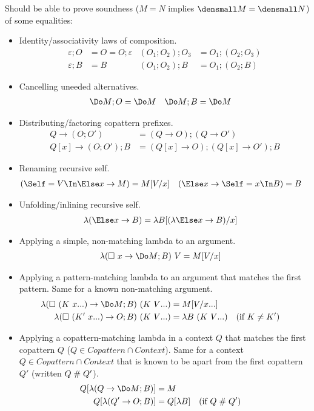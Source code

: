 \documentclass[runningheads]{llncs}
\begin{document}
Should be able to prove soundness ($M = N$ implies $\den{M} = \den{N}$) of some
equalities:
\begin{itemize}
\item Identity/associativity laws of composition.
  \begin{align*}
    \varepsilon; O &= O = O; \varepsilon
    &
    (O_1; O_2); O_3 &= O_1; (O_2; O_3)
    \\
    \varepsilon; B &= B
    &
    (O_1; O_2); B &= O_1; (O_2; B)
  \end{align*}
\item Cancelling uneeded alternatives.
  \begin{align*}
    \Do M; O &= \Do M
    &
    \Do M; B &= \Do M
  \end{align*}
\item Distributing/factoring copattern prefixes.
  \begin{align*}
    Q \to (O; O')
    &=
    (Q \to O); (Q \to O')
    \\
    Q[x] \to (O; O'); B
    &=
    (Q[x] \to O); (Q[x] \to O'); B
  \end{align*}
\item Renaming recursive self.
  \begin{align*}
    (\Self = V \In \Else x \to M) &= M\subst{x}{V}
    &
    (\Else x \to \Self = x \In B) &= B
  \end{align*}
\item Unfolding/inlining recursive self.
  \begin{align*}
    \lambda(\Else x \to B) &= \lambda B\subst{x}{(\lambda \Else x \to B)}
  \end{align*}
\item Applying a simple, non-matching lambda to an argument.
  \begin{align*}
    \lambda(\hole~x \to \Do M; B) ~ V
    &=
    M\subst{x}{V}
  \end{align*}
\item Applying a pattern-matching lambda to an argument that matches the
  first pattern.  Same for a known non-matching argument.
  \begin{align*}
    \lambda(\hole~(K~\many{x}) \to \Do M; B) ~ (K~\many{V})
    &=
    M\subs{\many{\asub{x}{V}}}
    \\
    \lambda(\hole~(K'~\many{x}) \to O; B) ~ (K~\many{V})
    &=
    \lambda B ~ (K~\many{V})
    &(\text{if } K &\neq K')
  \end{align*}
\item Applying a copattern-matching lambda in a context $Q$ that matches the
  first copattern $Q$ (\ie $Q \in \mathit{Copattern} \cap \mathit{Context}$).
  Same for a context $Q \in \mathit{Copattern} \cap \mathit{Context}$ that is
  known to be apart from the first copattern $Q'$ (written $Q \mathrel{\#} Q'$).
  \begin{align*}
    Q[\lambda(Q \to \Do M; B)] &= M
    \\
    Q[\lambda(Q' \to O; B)] &= Q[\lambda B]
    &(\text{if } Q &\apart Q')
  \end{align*}
\end{itemize}
\end{document}
